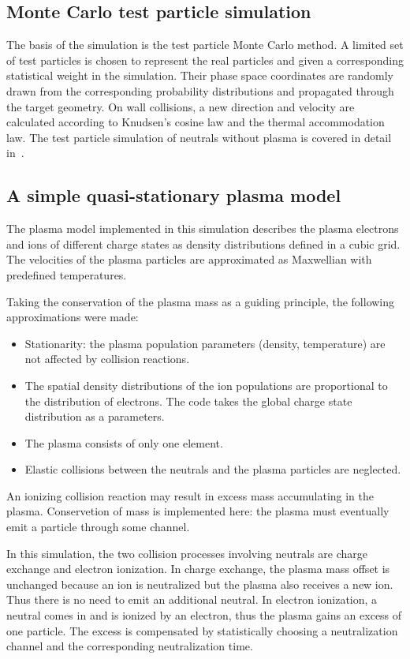 \documentclass[a4paper,twoside,12pt]{article}
\begin{document}
\subsection{Monte Carlo test particle simulation}
The basis of the simulation is the test particle Monte Carlo method. A limited set of test particles is chosen to represent the real particles and given a corresponding statistical weight in the simulation. Their phase space coordinates are randomly drawn from the corresponding probability distributions and propagated through the target geometry. On wall collisions, a new direction and velocity are calculated according to Knudsen's cosine law and the thermal accommodation law. The test particle simulation of neutrals without plasma is covered in detail in~\cite{kapanen:bsc}.

\subsection{A simple quasi-stationary plasma model}
The plasma model implemented in this simulation describes the plasma electrons and ions of different charge states as density distributions defined in a cubic grid. The velocities of the plasma particles are approximated as Maxwellian with predefined temperatures.

Taking the conservation of the plasma mass as a guiding principle, the following approximations were made:
\begin{itemize}
    \item Stationarity: the plasma population parameters (density, temperature) are not affected by collision reactions.
    \item The spatial density distributions of the ion populations are proportional to the distribution of electrons. The code takes the global charge state distribution as a parameters.
    \item The plasma consists of only one element.
    \item Elastic collisions between the neutrals and the plasma particles are neglected.
\end{itemize}

An ionizing collision reaction may result in excess mass accumulating in the plasma. Conservetion of mass is implemented here: the plasma must eventually emit a particle through some channel.

In this simulation, the two collision processes involving neutrals are charge exchange and electron ionization. In charge exchange, the plasma mass offset is unchanged because an ion is neutralized but the plasma also receives a new ion. Thus there is no need to emit an additional neutral. In electron ionization, a neutral comes in and is ionized by an electron, thus the plasma gains an excess of one particle. The excess is compensated by statistically choosing a neutralization channel and the corresponding neutralization time.
\end{document}
